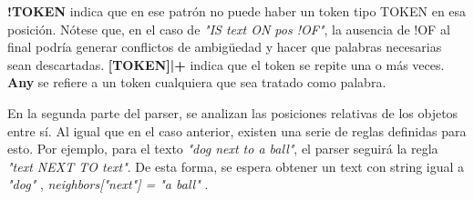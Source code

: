 \textbf{!TOKEN} indica que en ese patr\'on no puede haber un token tipo TOKEN en esa posici\'on. N\'otese que, en el caso de \textit{"IS text ON pos !OF"}, la ausencia de !OF al final podría generar conflictos de ambigüedad y hacer que palabras necesarias sean descartadas. \textbf{[TOKEN]|+} indica que el token se repite una o m\'as veces. \textbf{Any} se refiere a un token cualquiera que sea tratado como palabra.

En la segunda parte del parser, se analizan las posiciones relativas de los objetos entre sí. Al igual que en el caso anterior, existen una serie de reglas definidas para esto. Por ejemplo, para el texto \textit{"dog next to a ball"}, el parser seguirá la regla \textit{"text NEXT TO text"}. De esta forma, se espera obtener un text con string igual a \textit{ "dog" }, \textit{neighbors["next"] = "a ball" }.


